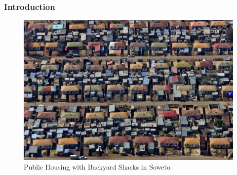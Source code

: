 \documentclass[aspectratio=149]{beamer}
\begin{document}

\begin{frame}
\frametitle{Introduction}
\centering

\begin{figure}
 \includegraphics[scale=.25]{figures/shacks.jpg} 
 \caption{Public Housing with Backyard Shacks in Soweto}
\end{figure}

\end{frame}

\end{document}
